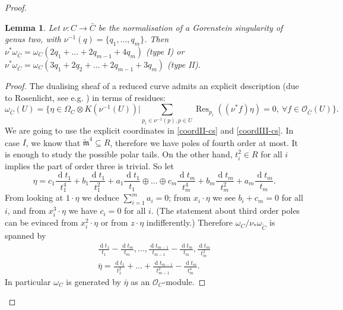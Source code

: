 \documentclass[11pt]{amsart}
\newcommand{\tm}{\widetilde{\mathfrak m}}
\newcommand{\OO}{\mathcal O}
\renewcommand{\to}{\rightarrow}
\theoremstyle{plain}
\newtheorem{lem}[thm]{Lemma}
\theoremstyle{definition}
\begin{document}
\begin{proof}
\begin{lem}\label{lem:dualising_lb}
 Let $\nu\colon C\to \bar C$ be the normalisation of a Gorenstein singularity of genus two, with $\nu^{-1}(q)=\{q_1,\ldots,q_m\}$. Then  $\nu^*\omega_{\bar C}=\omega_C(2q_1+\ldots+2q_{m-1}+4q_m)$ (type I) or $\nu^*\omega_{\bar C}=\omega_C(3q_1+2q_2+\ldots+2q_{m-1}+3q_m)$ (type II).
\end{lem}
\begin{proof}
 The dualising sheaf of a reduced curve admits an explicit description (due to Rosenlicht, see e.g. \cite[Proposition VIII.1.16]{AK}) in terms of residues:
 \[\omega_{\bar C}(U)=\{\eta\in \Omega_{C}\otimes K(\nu^{-1}(U)) | \sum_{p_i\in\nu^{-1}(p),p\in U}\operatorname{Res}_{p_i}((\nu^*f)\eta)=0,\ \forall f\in\OO_{\bar C}(U)\}.\]
 We are going to use the explicit coordinates in \eqref{coordII-cs} and \eqref{coordIII-cs}.
 In case $I$, we know that $\tm^4\subseteq R$, therefore we have poles of fourth order at most. It is enough to study the possible polar tails. On the other hand, $t_i^2\in R$ for all $i$ implies the part of order three is trivial. So let \[\eta=c_1\frac{\operatorname{d}t_1}{t_1^4}+b_1\frac{\operatorname{d}t_1}{t_1^2}+a_1\frac{\operatorname{d}t_1}{t_1}\oplus\ldots\oplus c_m\frac{\operatorname{d}t_m}{t_m^4}+b_m\frac{\operatorname{d}t_m}{t_m^2}+a_m\frac{\operatorname{d}t_m}{t_m}.\]
 From looking at $1\cdot\eta$ we deduce $\sum_{i=1}^m a_i=0$; from $x_i\cdot\eta$ we see $b_i+c_m=0$ for all $i$, and from $x_i^3\cdot\eta$ we have $c_i=0$ for all $i$. (The statement about third order poles can be evinced from $x_i^2\cdot\eta$ or from $z\cdot\eta$ indifferently.) Therefore $\omega_C/\nu_*\omega_{\tilde C}$ is spanned by
 \begin{align*}
  \frac{\operatorname{d}t_1}{t_1}-\frac{\operatorname{d}t_m}{t_m},\ldots,\frac{\operatorname{d}t_{m-1}}{t_{m-1}}-\frac{\operatorname{d}t_m}{t_m},\frac{\operatorname{d}t_m}{t_m^2}\\
  \bar{\eta}=\frac{\operatorname{d}t_1}{t_1^2}+\ldots+\frac{\operatorname{d}t_{m-1}}{t_{m-1}^2}-\frac{\operatorname{d}t_m}{t_m^4}.
 \end{align*}
In particular $\omega_C$ is generated by $\bar{\eta}$ as an $\OO_C$-module. 


\end{proof}
\end{proof}
\end{document}
